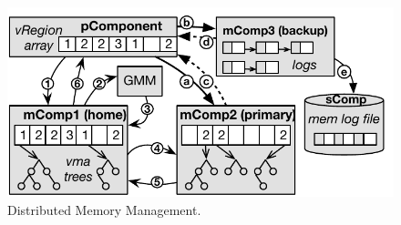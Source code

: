 {
\begin{figure}[th]
\begin{minipage}{\figWidth}
\begin{center}
\centerline{\includegraphics[width=5in]{lego/Figures/dist-vma.pdf}}
\caption[Distributed Memory Management.]{Distributed Memory Management.}
\label{fig-dist-vma}
\end{center}
\end{minipage}
\end{figure}
}
